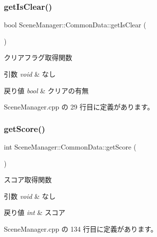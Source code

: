 \subsubsection{\texorpdfstring{get\+Is\+Clear()}{getIsClear()}}
{\footnotesize\ttfamily bool Scene\+Manager\+::\+Common\+Data\+::get\+Is\+Clear (\begin{DoxyParamCaption}{ }\end{DoxyParamCaption})}



クリアフラグ取得関数 


\begin{DoxyParams}{引数}
{\em void} & なし \\
\hline
\end{DoxyParams}

\begin{DoxyRetVals}{戻り値}
{\em bool} & クリアの有無 \\
\hline
\end{DoxyRetVals}


 Scene\+Manager.\+cpp の 29 行目に定義があります。

\mbox{\label{class_scene_manager_1_1_common_data_a46075a835d6fef5e1e00befc4ab6b2cd}} 
\subsubsection{\texorpdfstring{get\+Score()}{getScore()}}
{\footnotesize\ttfamily int Scene\+Manager\+::\+Common\+Data\+::get\+Score (\begin{DoxyParamCaption}{ }\end{DoxyParamCaption})}



スコア取得関数 


\begin{DoxyParams}{引数}
{\em void} & なし \\
\hline
\end{DoxyParams}

\begin{DoxyRetVals}{戻り値}
{\em int} & スコア \\
\hline
\end{DoxyRetVals}


 Scene\+Manager.\+cpp の 134 行目に定義があります。

